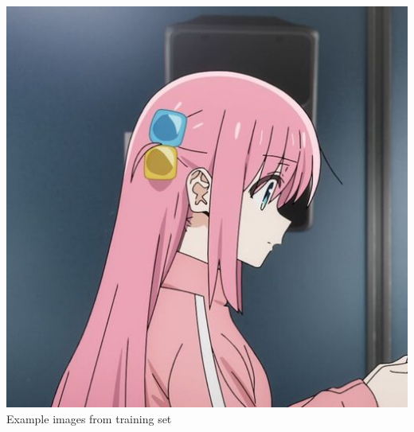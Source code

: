 \documentclass{article}
\begin{document}
\begin{center}
    \includegraphics[scale=0.15]{.imgs/dataset/chrome_mwcqZdCXfv.jpg} \\
    Example images from training set
\end{center}
\end{document}
